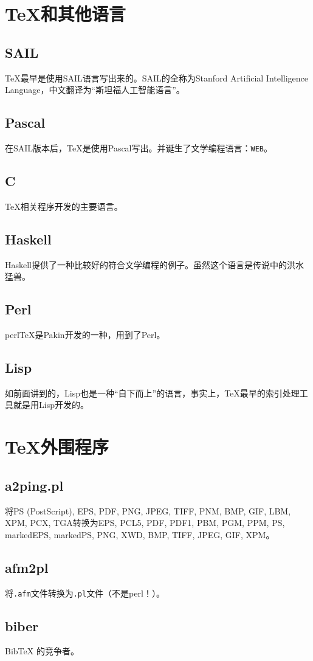 \documentclass{article}
\begin{document}
\section{\TeX 和其他语言}
\subsection{SAIL}
\TeX 最早是使用SAIL语言写出来的。SAIL的全称为Stanford Artificial Intelligence Language，中文翻译为“斯坦福人工智能语言”。
\subsection{Pascal}
在SAIL版本后，\TeX 是使用Pascal写出。并诞生了文学编程语言：\verb!WEB!。
\subsection{C}
\TeX 相关程序开发的主要语言。
\subsection{Haskell}
Haskell提供了一种比较好的符合文学编程的例子。虽然这个语言是传说中的洪水猛兽。
\subsection{Perl}
perl\TeX 是Pakin开发的一种，用到了Perl。
\subsection{Lisp}
如前面讲到的，Lisp也是一种“自下而上”的语言，事实上，\TeX 最早的索引处理工具就是用Lisp开发的。
\section{\TeX 外围程序}
\subsection{a2ping.pl}
将PS (PostScript), EPS, PDF, PNG, JPEG, TIFF, PNM, BMP, GIF, LBM, XPM, PCX, TGA转换为EPS, PCL5, PDF, PDF1, PBM, PGM, PPM, PS, markedEPS,
markedPS, PNG, XWD, BMP, TIFF, JPEG, GIF, XPM。
\subsection{afm2pl}
将\verb!.afm!文件转换为\verb!.pl!文件（不是perl！）。
\subsection{biber}
BibTeX 的竞争者。
\end{document}
